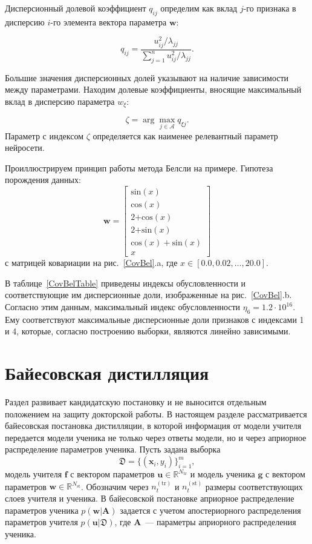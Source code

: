 Дисперсионный долевой коэффициент $q_{ij}$ определим как вклад $j$-го признака в дисперсию $i$-го элемента вектора параметра $\textbf{w}$:

\[
q_{ij} = \frac{u^2_{ij}/\lambda_{jj}}{\sum^n_{j=1}{u^2_{ij}/\lambda_{jj}}}.
\]

Большие значения дисперсионных долей указывают на наличие зависимости между параметрами. Находим долевые коэффициенты, вносящие максимальный вклад в дисперсию параметра $w_\xi$:

\[
\zeta = \arg\max_{j\in \mathcal{A}}{q_{\xi j}}.
\]
Параметр с индексом $\zeta$ определяется как наименее релевантный параметр нейросети.

Проиллюстрируем принцип работы метода Белсли на примере. Гипотеза порождения данных:
\[
    \textbf{w} = \begin{bmatrix}
    \text{sin}(x)\\
    \text{cos}(x)\\
    \text{2+cos}(x)\\
    \text{2+sin}(x)\\
    \text{cos}(x) + \text{sin}(x)\\
    x
    \end{bmatrix}
\]
с матрицей ковариации на рис.~\ref{CovBel}.a, где $x \in [0.0, 0.02, \ldots, 20.0]$.

В таблице~\ref{CovBelTable} приведены индексы обусловленности и соответствующие им дисперсионные доли, изображенные на рис.~\ref{CovBel}.b. Согласно этим данным, максимальный индекс обусловленности $\eta_6 = 1.2\cdot 10^{16}$. Ему соответствуют максимальные дисперсионные доли признаков с индексами 1 и 4, которые, согласно построению выборки, являются линейно зависимыми.

\section{Байесовская дистилляция}

Раздел развивает кандидатскую постановку и не выносится отдельным положением на защиту докторской работы.
В настоящем разделе рассматривается байесовская постановка дистилляции, в которой информация от модели учителя передается модели ученика не только через ответы модели, но и через априорное распределение параметров ученика. Пусть задана выборка
\[
    \mathfrak{D} = \{(\mathbf{x}_i,y_i)\}_{i=1}^{m},
\]
модель учителя $\mathbf{f}$ с вектором параметров $\mathbf{u}\in\mathbb{R}^{N_{\mathrm{tr}}}$ и модель ученика $\mathbf{g}$ с вектором параметров $\mathbf{w}\in\mathbb{R}^{N_{\mathrm{st}}}$. Обозначим через $n_t^{(\mathrm{tr})}$ и $n_t^{(\mathrm{st})}$ размеры соответствующих слоев учителя и ученика. В байесовской постановке априорное распределение параметров ученика $p(\mathbf{w}|\mathbf{A})$ задается с учетом апостериорного распределения параметров учителя $p(\mathbf{u}|\mathfrak{D})$, где $\mathbf{A}$~--- параметры априорного распределения ученика.

